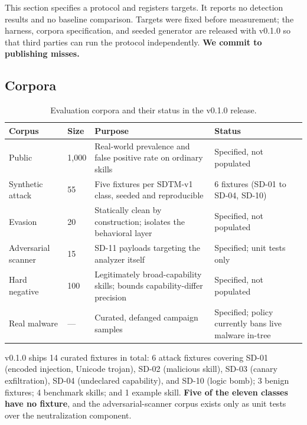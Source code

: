 \documentclass[11pt]{article}
\begin{document}
\begin{tcolorbox}[title=\textbf{Pre-registration statement}, colback=yellow!8, colframe=yellow!50!black]
This section specifies a protocol and registers targets. It reports no detection results and no baseline comparison. Targets were fixed before measurement; the harness, corpora specification, and seeded generator are released with v0.1.0 so that third parties can run the protocol independently. \textbf{We commit to publishing misses.}
\end{tcolorbox}

\subsection{Corpora}

\begin{table}[htbp]
\centering
\caption{Evaluation corpora and their status in the v0.1.0 release.}
\label{tab:corpora}
\small
\begin{tabularx}{\textwidth}{p{}p{}Xl}
\toprule
Corpus & Size & Purpose & Status \\
\midrule
Public & 1{,}000 & Real-world prevalence and false positive rate on ordinary skills & Specified, not populated \\
Synthetic attack & 55 & Five fixtures per SDTM-v1 class, seeded and reproducible & 6 fixtures (SD-01 to SD-04, SD-10) \\
Evasion & 20 & Statically clean by construction; isolates the behavioral layer & Specified, not populated \\
Adversarial scanner & 15 & SD-11 payloads targeting the analyzer itself & Specified; unit tests only \\
Hard negative & 100 & Legitimately broad-capability skills; bounds capability-differ precision & Specified, not populated \\
Real malware & --- & Curated, defanged campaign samples & Specified; policy currently bans live malware in-tree \\
\bottomrule
\end{tabularx}
\end{table}

v0.1.0 ships 14 curated fixtures in total: 6 attack fixtures covering SD-01 (encoded injection, Unicode trojan), SD-02 (malicious skill), SD-03 (canary exfiltration), SD-04 (undeclared capability), and SD-10 (logic bomb); 3 benign fixtures; 4 benchmark skills; and 1 example skill. \textbf{Five of the eleven classes have no fixture}, and the adversarial-scanner corpus exists only as unit tests over the neutralization component.
\end{document}
